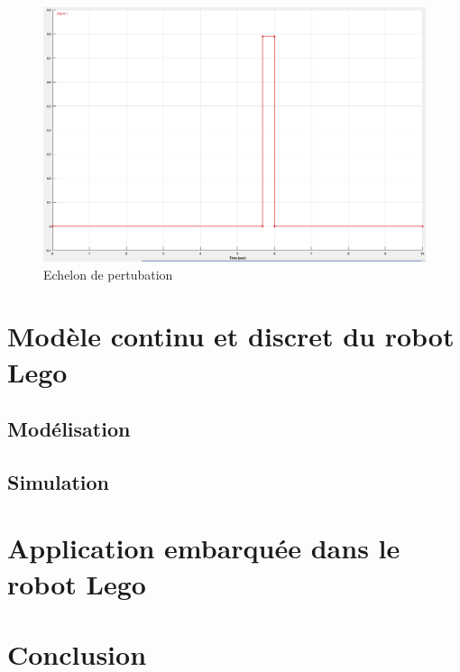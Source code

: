 \documentclass[11pt]{article}
\begin{document}
\begin{figure}[h!]
	\includegraphics[scale=0.2]{images/pendule_inverse_perturbation}
	\caption{Echelon de pertubation}
\end{figure}
\section{Modèle continu et discret du robot Lego}
\subsection{Modélisation}
\subsection{Simulation}

\section{Application embarquée dans le robot Lego}

\section*{Conclusion}
\end{document}
